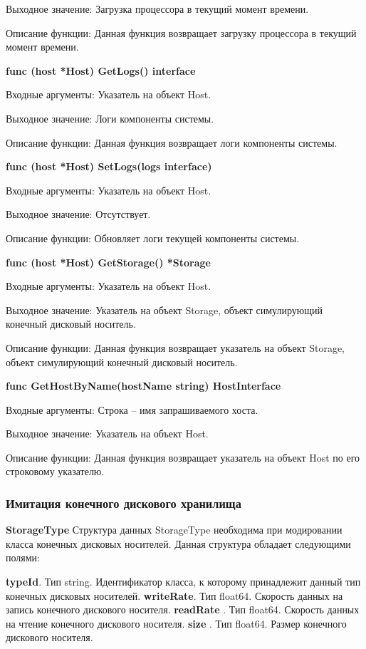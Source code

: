 Выходное значение: Загрузка процессора в текущий момент времени.

Описание функции: Данная функция возвращает загрузку процессора в текущий момент времени.


\textbf{func (host *Host) GetLogs() interface}

Входные аргументы: Указатель на объект Host.

Выходное значение: Логи компоненты системы. 

Описание функции: Данная функция возвращает логи компоненты системы. 


\textbf{func (host *Host) SetLogs(logs interface)}

Входные аргументы: Указатель на объект Host.

Выходное значение: Отсутствует.

Описание функции: Обновляет логи текущей компоненты системы. 


\textbf{func (host *Host) GetStorage() *Storage }

Входные аргументы: Указатель на объект Host.

Выходное значение: Указатель на объект Storage, объект симулирующий конечный дисковый носитель.

Описание функции: Данная функция возвращает указатель на объект Storage, объект симулирующий конечный дисковый носитель.


\textbf{func GetHostByName(hostName string) HostInterface }

Входные аргументы: Строка -- имя запрашиваемого хоста. 

Выходное значение: Указатель на объект Host.

Описание функции: Данная функция возвращает указатель на объект Host по его строковому указателю.

\subsubsection{Имитация конечного дискового хранилища}
\textbf{StorageType}
Структура данных StorageType необходима при модировании класса конечных дисковых носителей. Данная структура обладает следующими полями:

\textbf{	typeId}. Тип    string. Идентификатор класса, к которому принадлежит данный тип конечных дисковых носителей. 
\textbf{	writeRate}. Тип float64. Скорость данных на запись конечного дискового носителя.
\textbf{	readRate }. Тип float64. Скорость данных на чтение конечного дискового носителя.
\textbf{	size     }. Тип float64. Размер конечного дискового носителя.

